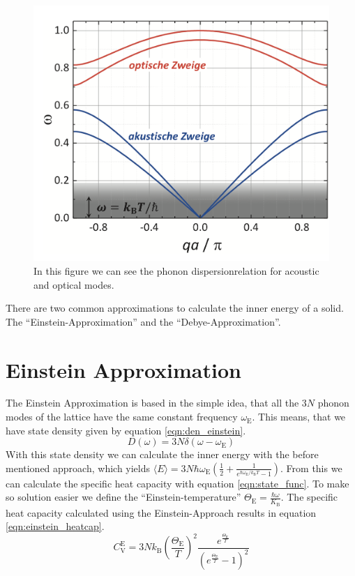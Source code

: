 \begin{figure}
    \centering
    \includegraphics[scale=0.4]{content/V47_pictures/phonondispersion.png}
    \caption{In this figure we can see the phonon dispersionrelation for acoustic and optical modes. \cite{grossmarx}}
    \label{fig:phonondispersion}
\end{figure}

There are two common approximations to calculate the inner energy of a solid. The \enquote{Einstein-Approximation} and the \enquote{Debye-Approximation}.

\section{Einstein Approximation}
\label{sec:einstein}
The Einstein Approximation is based in the simple idea, that all the $3N$ phonon modes of the lattice have the same constant frequency $\omega_\mathrm{E}$. This means, that we have
state density given by equation \ref{eqn:den_einstein}.
\begin{equation}
    \label{eqn:den_einstein}
    D(\omega) = 3N\delta(\omega - \omega_\mathrm{E})
\end{equation}
With this state density we can calculate the inner energy with the before mentioned approach, which yields 
$\langle E \rangle = 3N\hbar\omega_\mathrm{E}(\frac{1}{2}+\frac{1}{e^{\hbar\omega_\mathrm{E}/k_\mathrm{B}T}-1})$. From this we can calculate the specific heat capacity with equation 
\ref{eqn:state_func}. To make so solution easier we define the \enquote{Einstein-temperature} $\Theta_\mathrm{E} = \frac{\hbar\omega}{K_\mathrm{B}}$. The specific heat capacity 
calculated using the Einstein-Approach results in equation \ref{eqn:einstein_heatcap}.
\begin{equation}
    \label{eqn:einstein_heatcap}
    C_{\mathrm{V}}^{\mathrm{E}} = 3Nk_\mathrm{B}\left(\frac{\Theta_\mathrm{E}}{T}\right)^2\frac{e^{\frac{\Theta_\mathrm{E}}{T}}}{\left(e^{\frac{\Theta_\mathrm{E}}{T}}-1\right)^2}
\end{equation} 

